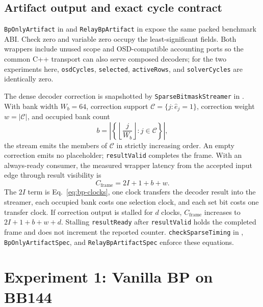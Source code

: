 \documentclass[10pt,conference]{IEEEtran}
\begin{document}
\subsection{Artifact output and exact cycle contract}
\texttt{BpOnlyArtifact} in  and
\texttt{RelayBpArtifact} in  expose the same
packed benchmark ABI.  Check zero and variable zero occupy the least-significant
fields.  Both wrappers include unused scope and OSD-compatible accounting ports
so the common C++ transport can also serve composed decoders; for the two
experiments here, \texttt{osdCycles}, \texttt{selected}, \texttt{activeRows},
and \texttt{solverCycles} are identically zero.

The dense decoder correction is snapshotted by
\texttt{SparseBitmaskStreamer} in .  With bank
width $W_b=64$, correction support
$\mathcal C=\{j:\hat e_j=1\}$, correction weight $w=|\mathcal C|$, and occupied
bank count
\begin{equation}
 b=\left|\left\{\left\lfloor\frac{j}{W_b}\right\rfloor:j\in\mathcal C\right\}\right|,
 \label{eq:occupied-banks}
\end{equation}
the stream emits the members of $\mathcal C$ in strictly increasing order.
An empty correction emits no placeholder; \texttt{resultValid} completes the
frame.  With an always-ready consumer, the measured wrapper latency from the
accepted input edge through result visibility is
\begin{equation}
 C_{\mathrm{frame}}=2I+1+b+w.
 \label{eq:sparse-frame-clocks}
\end{equation}
The $2I$ term is Eq.~\eqref{eq:bp-clocks}, one clock transfers the decoder result
into the streamer, each occupied bank costs one selection clock, and each set
bit costs one transfer clock.  If correction output is stalled for $d$ clocks,
$C_{\mathrm{frame}}$ increases to $2I+1+b+w+d$.  Stalling
\texttt{resultReady} after \texttt{resultValid} holds the completed frame and
does not increment the reported counter.  \texttt{checkSparseTiming} in
, \texttt{BpOnlyArtifactSpec}, and
\texttt{RelayBpArtifactSpec} enforce these equations.

\section{Experiment 1: Vanilla BP on BB144}
\end{document}

